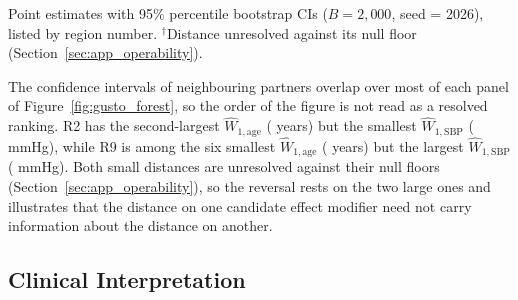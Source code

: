 \documentclass[AMA,Times1COL]{WileyNJDv5}
\begin{document}
\begin{table}[ht]
\centering
\caption{Per-effect-modifier Wasserstein-1 distance $\widehat{W}_1$ in original variable units (years for age, mmHg for SBP) with 95\% percentile bootstrap CIs for Region~8 versus each partner region (GUSTO-I), listed by region number.\label{tab:gusto_nabcd}}
%
\begin{tablenotes}
\item Point estimates with 95\% percentile bootstrap CIs ($B = 2{,}000$, seed = 2026), listed by region number. $^\dagger$Distance unresolved against its null floor (Section~\ref{sec:app_operability}).%
\end{tablenotes}
\end{table}



The confidence intervals of neighbouring partners overlap over most of each panel of Figure~\ref{fig:gusto_forest}, so the order of the figure is not read as a resolved ranking.
R2 has the second-largest $\widehat{W}_{1,\text{age}}$ ( years) but the smallest $\widehat{W}_{1,\text{SBP}}$ ( mmHg), while R9 is among the six smallest $\widehat{W}_{1,\text{age}}$ ( years) but the largest $\widehat{W}_{1,\text{SBP}}$ ( mmHg). Both small distances are unresolved against their null floors (Section~\ref{sec:app_operability}), so the reversal rests on the two large ones and illustrates that the distance on one candidate effect modifier need not carry information about the distance on another.

\subsection{Clinical Interpretation}\label{sec:app_clinical}
\end{document}
